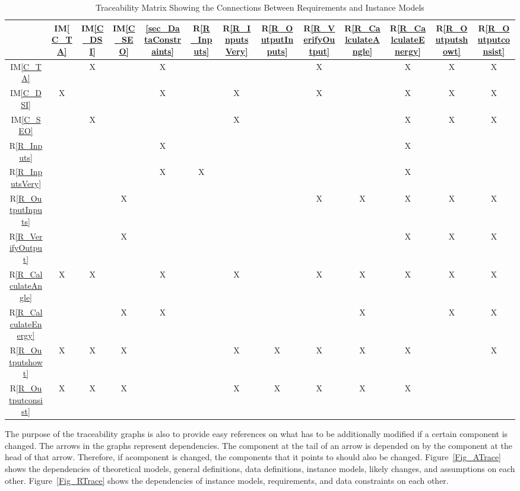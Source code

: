 \documentclass[12pt]{article}
\newcommand{\iref}[1]{IM\ref{#1}}
\newcommand{\rref}[1]{R\ref{#1}}
\begin{document}
\begin{table}[h!]
\centering
\begin{tabular}{|c|c|c|c|c|c|c|c|c|c|c|c|c|}
\hline
& \iref{C_TA} & \iref{C_DSI} 	& \iref{C_SEO}& \ref{sec_DataConstraints}& \rref{R_Inputs}&\rref{R_InputsVery} & \rref{R_OutputInputs}&\rref{R_VerifyOutput}&\rref{R_CalculateAngle} &\rref{R_CalculateEnergy}&\rref{R_Outputshowt}&\rref{R_Outputconsist} \\

\hline
\iref{C_TA}         				&    & X &    & X &     &    &    &X&    &X&X&X
 \\ \hline
\iref{C_DSI} 						& X &    &    & X &     & X &    &X&    &X&X&X
 \\ \hline
\iref{C_SEO}           		&    & X &    &    &     & X &     &    &    &X&X&X
\\ \hline
\rref{R_Inputs}    				&    &    &    & X &     &    &    &    &    &X&    &   
\\ \hline
\rref{R_InputsVery}  		&    &    &    & X & X  &    &    &    &    &X&    &   
\\ \hline
\rref{R_OutputInputs}  &    &    & X &    &     &    &    &X&X&X&X&X
\\ \hline
\rref{R_VerifyOutput}  	&    &    & X &    &     &    &    &    &    &X&X&X
\\ \hline 
\rref{R_CalculateAngle}    & X & X &     & X &     & X  &    &X&X&X&X&X
 \\ \hline
\rref{R_CalculateEnergy}  &    &    & X & X &     &    &    &    &X&    &X&X
 \\ \hline
\rref{R_Outputshowt}       		& X & X & X &     &     & X  & X  &X&X&X&    &X
\\ \hline
\rref{R_Outputconsist}       	& X & X & X &     &     & X  & X  &X&X&X&    &   
\\ \hline
\end{tabular}
\caption{Traceability Matrix Showing the Connections Between Requirements and
Instance Models}
\label{Table:R_trace}
\end{table}

The purpose of the traceability graphs is also to provide easy references on
what has to be additionally modified if a certain component is changed.  The
arrows in the graphs represent dependencies. The component at the tail of an
arrow is depended on by the component at the head of that arrow. Therefore, if
acomponent is changed, the components that it points to should also be
changed. Figure~\ref{Fig_ATrace} shows the dependencies of theoretical models,
general definitions, data definitions, instance models, likely changes, and
assumptions on each other.  Figure~\ref{Fig_RTrace} shows the dependencies of
instance models, requirements, and data constraints on each other.
\end{document}
